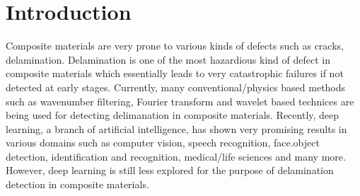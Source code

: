 \section{Introduction}
Composite materials are very prone to various kinds of defects such as cracks, delamination. Delamination is one of the most hazardious kind of defect in composite materials which essentially leads to very catastrophic failures if not detected at early stages. Currently, many conventional/physics based methods such as wavenumber filtering, Fourier transform and wavelet based technices are being used for detecting delimanation in composite materials. Recently, deep learning, a branch of artificial intelligence, has shown very promising results in various domains such as computer vision, speech recognition, face.object detection, identification and recognition, medical/life sciences and many more. However, deep learning is still less explored for the purpose of delamination detection in composite materials.   
%	
